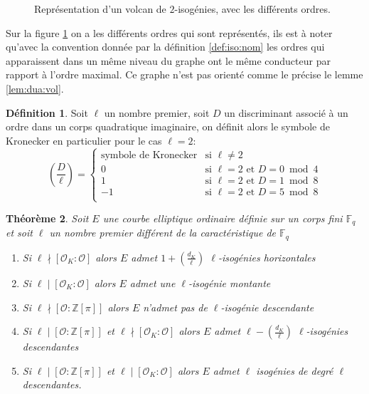 \documentclass[10pt,a4paper]{book}
\theoremstyle{plain}
\newtheorem{thm}{Théorème}[chapter]
\theoremstyle{definition}
\theoremstyle{definition}
\theoremstyle{definition}
\theoremstyle{definition}
\newtheorem{defi}[thm]{Définition}
\theoremstyle{remark}
\theoremstyle{remark}
\theoremstyle{definition}
\begin{document}
\begin{figure}
\begin{center}
\begin{tikzpicture}[scale=0.60]


\end{tikzpicture}
\end{center}
\caption{Représentation d'un volcan de $2$-isogénies, avec les différents ordres.}		
\label{fig:ord:vol}
\end{figure}
Sur la figure \ref{fig:ord:vol} on a les différents ordres qui sont représentés, ils est à noter qu'avec la convention donnée par la définition \ref{def:iso:nom} les ordres qui apparaissent dans un même niveau du graphe ont le même conducteur par rapport à l'ordre maximal. Ce graphe n'est pas orienté comme le précise le lemme \ref{lem:dua:vol}.

\begin{defi}
Soit $\ell$ un nombre premier, soit $D$ un discriminant associé à un ordre dans
un corps quadratique imaginaire, on définit alors le symbole de Kronecker en 
particulier pour le cas $\ell=2$:
\begin{equation*}
\left( \frac{D}{\ell} \right)= \begin{cases}
  \text{symbole de Kronecker} & \text{si } \ell\neq 2 \\
0 & \text{si } \ell=2 \text{ et } D=0 \bmod 4 \\
1 & \text{si } \ell=2 \text{ et } D=1 \bmod 8 \\
-1 & \text{si } \ell=2 \text{ et } D=5 \bmod 8 \\
\end{cases}
\end{equation*}
\end{defi}

\begin{thm}
\label{thm:Koh:cas}
Soit $E$ une courbe elliptique ordinaire définie sur un corps fini $\mathbb{F}_q$ et soit $\ell$ un nombre premier différent de la caractéristique de $\mathbb{F}_q$
\begin{enumerate}
\item Si $\ell \nmid [\mathcal{O}_K : \mathcal{O}]$ alors $E$ admet $ 1 + \left( \frac{d_K}{\ell} \right)$ $\ell$-isogénies horizontales
\item Si $\ell \mid [\mathcal{O}_K : \mathcal{O}]$ alors $E$ admet une $\ell$-isogénie montante
\item Si $\ell \nmid [\mathcal{O} : \mathbb{Z}[\pi]]$ alors $E$ n'admet pas de $\ell$-isogénie descendante
\item Si $\ell \mid [\mathcal{O} : \mathbb{Z}[\pi]]$ et $\ell \nmid [\mathcal{O}_K : \mathcal{O}]$ alors $E$ admet $\ell-\left( \frac{d_K}{\ell} \right)$ $\ell$-isogénies descendantes
\item  Si $\ell \mid [\mathcal{O} : \mathbb{Z}[\pi]]$ et $\ell \mid [\mathcal{O}_K : \mathcal{O}]$ alors $E$ admet $\ell$ isogénies de degré $\ell$ descendantes.
\end{enumerate}
\end{thm}
\end{document}
